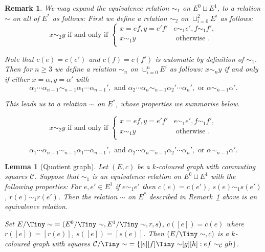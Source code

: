 \documentclass[10pt,a4paper]{amsart}
\newtheorem{rmk}{Remark}
\newtheorem{lem}{Lemma}
\newcommand{\Cc}{\mathcal{C}}
\begin{document}
\begin{rmk} \label{rmk:simdef}
We may expand the equivalence relation $\sim_1$ on $E^0 \sqcup E^1$, to a relation $\sim$ on all of $E^*$ as follows:  First we define a relation $\sim_2$ on $\sqcup_{i=0}^2 E^i$ as follows: 
\begin{equation} \label{eq:nested1}
x \sim_2  y \text{ if and only if } \begin{cases} x=ef, y=e'f' & e \sim_1 e', f \sim_1 f', \\
x \sim_1 y & \text{ otherwise }. \\
\end{cases}
\end{equation}

\noindent
Note that $c(e)=c(e')$ and $c(f)=c(f')$ is automatic by definition of $\sim_1$. Then for $n \ge 3$ we define a relation $\sim_n$ on $\sqcup_{i=0}^n E^i$ as follows: $x \sim_n  y$ if and only if either $x=\alpha ,y=\alpha'$ with 
\begin{equation} \label{eq:nested2}
\alpha_1\cdots \alpha_{n-1} \sim_{n-1} \alpha_1 \cdots \alpha_{n-1}',  \text{ and } \alpha_2 \cdots \alpha_n \sim_{n-1} \alpha_2' \cdots   \alpha_n', \text { or } \alpha \sim_{n-1} \alpha'  .
\end{equation}

\noindent
This leads us to a relation $\sim$ on $E^*$, whose properties we summarise below.
\end{rmk}

\begin{equation} 
x \sim_2  y \text{ if and only if } \begin{cases} x=ef, y=e'f' & e \sim_1 e', f \sim_1 f', \\
x \sim_1 y & \text{ otherwise }. \\
\end{cases}
\end{equation}

\begin{equation} 
\alpha_1\cdots \alpha_{n-1} \sim_{n-1} \alpha_1 \cdots \alpha_{n-1}',  \text{ and } \alpha_2 \cdots \alpha_n \sim_{n-1} \alpha_2' \cdots   \alpha_n', \text { or } \alpha \sim_{n-1} \alpha'  .
\end{equation}

\begin{lem}[Quotient graph] \label{lem:quotient k-colouredgraph}
Let $(E,c)$ be a $k$-coloured graph with commuting squares $\Cc$.  
Suppose that $\sim_1$ is an equivalence relation on $E^0 \sqcup E^1$
with the following properties: For $e,e' \in E^1$ if $e \sim_1 e'$ then $c(e) = c(e')$, $s(e) \sim_1 s(e')$, $r(e) \sim_1 r(e')$. Then the relation $\sim$ on $E^*$ described in Remark~\ref{rmk:simdef} above is an equivalence relation.

Set $E/{\Tiny\sim}  = (E^0/{\Tiny\sim},E^1/{\Tiny\sim},r,s)$, $c([e])=c(e)$ where $r([e])=[r(e)]$, $s([e])=[s(e)]$. Then $( E/{\Tiny\sim} , c )$ is a $k$-coloured graph with squares $\Cc / {\Tiny\sim}= \{ [e][f] {\Tiny\sim} [g][h] : ef \sim_\Cc gh \}$.
\end{lem}
\end{document}
